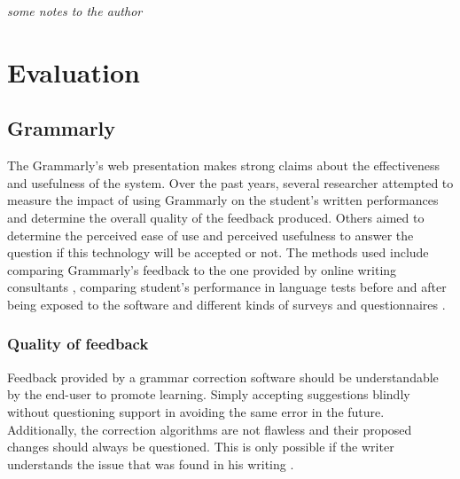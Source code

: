 \documentclass[runningheads]{llncs}
\begin{document}
\vspace*{6mm}\hspace*{6mm} \textit{some notes to the author}  \par

\section{Evaluation}

\subsection{Grammarly}
The Grammarly's web presentation \citep{noauthor_write_nodate} makes strong claims about the effectiveness and usefulness of the system. Over the past years, several researcher attempted to measure the impact of using Grammarly on the student's written performances and determine the overall quality of the feedback produced. Others \citep{cavaleri_you_2016} aimed to determine the perceived ease of use and perceived usefulness to answer the question if this technology will be accepted or not. The methods used include comparing Grammarly's feedback to the one provided by online writing consultants \citep{dembsey_closing_2017}, comparing student's performance in language tests before and after being exposed to the software \citep{qassemzadeh_impact_2016} and different kinds of surveys and questionnaires \citep{nova_utilizing_2018} \citep{cavaleri_you_2016} \citep{ventayen_graduate_2018}.

\subsubsection{Quality of feedback}
Feedback provided by a grammar correction software should be understandable by the end-user to promote learning. Simply accepting suggestions blindly without questioning support in avoiding the same error in the future. Additionally, the correction algorithms are not flawless and their proposed changes should always be questioned. This is only possible if the writer understands the issue that was found in his writing \citep{dembsey_closing_2017}.
\end{document}
